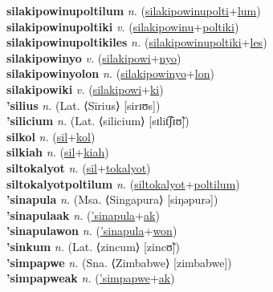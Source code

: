 \textbf{silakipowinupoltilum} \textit{n.} (\hyperref[silakipowinupolti]{silakipowinupolti}+\hyperref[lum]{lum})
 \label{silakipowinupoltilum} \\
\textbf{silakipowinupoltiki} \textit{v.} (\hyperref[silakipowinu]{silakipowinu}+\hyperref[poltiki]{poltiki})
 \label{silakipowinupoltiki} \\
\textbf{silakipowinupoltikiles} \textit{n.} (\hyperref[silakipowinupoltiki]{silakipowinupoltiki}+\hyperref[les]{les})
 \label{silakipowinupoltikiles} \\
\textbf{silakipowinyo} \textit{v.} (\hyperref[silakipowi]{silakipowi}+\hyperref[nyo]{nyo})
 \label{silakipowinyo} \\
\textbf{silakipowinyolon} \textit{n.} (\hyperref[silakipowinyo]{silakipowinyo}+\hyperref[lon]{lon})
 \label{silakipowinyolon} \\
\textbf{silakipowiki} \textit{v.} (\hyperref[silakipowi]{silakipowi}+\hyperref[ki]{ki})
 \label{silakipowiki} \\
\textbf{'silius} \textit{n.} (Lat. ⟨Sīrius⟩ [sirɪʊs])
 \label{'silius} \\
\textbf{'silicium} \textit{n.} (Lat. ⟨silicium⟩ [sɪlit͡ʃɪʊ̃])
 \label{'silicium} \\
\textbf{silkol} \textit{n.} (\hyperref[sil]{sil}+\hyperref[kol]{kol})
 \label{silkol} \\
\textbf{silkiah} \textit{n.} (\hyperref[sil]{sil}+\hyperref[kiah]{kiah})
 \label{silkiah} \\
\textbf{siltokalyot} \textit{n.} (\hyperref[sil]{sil}+\hyperref[tokalyot]{tokalyot})
 \label{siltokalyot} \\
\textbf{siltokalyotpoltilum} \textit{n.} (\hyperref[siltokalyot]{siltokalyot}+\hyperref[poltilum]{poltilum})
 \label{siltokalyotpoltilum} \\
\textbf{'sinapula} \textit{n.} (Msa. ⟨Singapura⟩ [siŋəpurə])
 \label{'sinapula} \\
\textbf{'sinapulaak} \textit{n.} (\hyperref['sinapula]{'sinapula}+\hyperref[ak]{ak})
 \label{'sinapulaak} \\
\textbf{'sinapulawon} \textit{n.} (\hyperref['sinapula]{'sinapula}+\hyperref[won]{won})
 \label{'sinapulawon} \\
\textbf{'sinkum} \textit{n.} (Lat. ⟨zincum⟩ [zincʊ̃])
 \label{'sinkum} \\
\textbf{'simpapwe} \textit{n.} (Sna. ⟨Zimbabwe⟩ [zimbabwe])
 \label{'simpapwe} \\
\textbf{'simpapweak} \textit{n.} (\hyperref['simpapwe]{'simpapwe}+\hyperref[ak]{ak})
